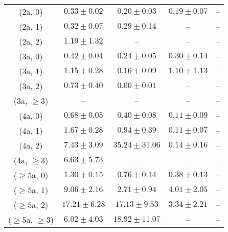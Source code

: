 \begin{table}[h!]
{\begin{tabular}{ccccc}
	(2a, 0) & $0.33\pm 0.02$ & $0.20\pm 0.03$ & $0.19\pm 0.07$ & -- \\[0.5ex] 
	(2a, 1) & $0.32\pm 0.07$ & $0.29\pm 0.14$ & -- & -- \\[0.5ex] 
	(2a, 2) & $1.19\pm 1.32$ & -- & -- & -- \\[0.5ex] 
	(3a, 0) & $0.42\pm 0.04$ & $0.24\pm 0.05$ & $0.30\pm 0.14$ & -- \\[0.5ex] 
	(3a, 1) & $1.15\pm 0.28$ & $0.16\pm 0.09$ & $1.10\pm 1.13$ & -- \\[0.5ex] 
	(3a, 2) & $0.73\pm 0.40$ & $0.00\pm 0.01$ & -- & -- \\[0.5ex] 
	(3a, $\ge3$) & -- & -- & -- & -- \\[0.5ex] 
	(4a, 0) & $0.68\pm 0.05$ & $0.40\pm 0.08$ & $0.11\pm 0.09$ & -- \\[0.5ex] 
	(4a, 1) & $1.67\pm 0.28$ & $0.94\pm 0.39$ & $0.11\pm 0.07$ & -- \\[0.5ex] 
	(4a, 2) & $7.43\pm 3.09$ & $35.24\pm 31.06$ & $0.14\pm 0.16$ & -- \\[0.5ex] 
	(4a, $\ge3$) & $6.63\pm 5.73$ & -- & -- & -- \\[0.5ex] 
	($\ge5$a, 0) & $1.30\pm 0.15$ & $0.76\pm 0.14$ & $0.38\pm 0.13$ & -- \\[0.5ex] 
	($\ge5$a, 1) & $9.06\pm 2.16$ & $2.71\pm 0.94$ & $4.01\pm 2.05$ & -- \\[0.5ex] 
	($\ge5$a, 2) & $17.21\pm 6.28$ & $17.13\pm 9.53$ & $3.34\pm 2.21$ & -- \\[0.5ex] 
	($\ge5$a, $\ge3$) & $6.02\pm 4.03$ & $18.92\pm 11.07$ & -- & -- \\[0.5ex] 
	\hline
	\hline
\end{tabular}}
\end{table}
